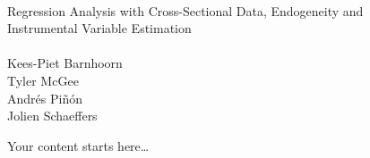 \documentclass[11pt, a4paper]{scrartcl}
\begin{document}
\\
{\Large Regression Analysis with Cross-Sectional Data, Endogeneity and\\
Instrumental Variable Estimation}\\[1em]

\\
Kees-Piet Barnhoorn\\
Tyler McGee\\
Andrés Piñón\\
Jolien Schaeffers\\

\vspace{2em}

\noindent Your content starts here\ldots
\end{document}
